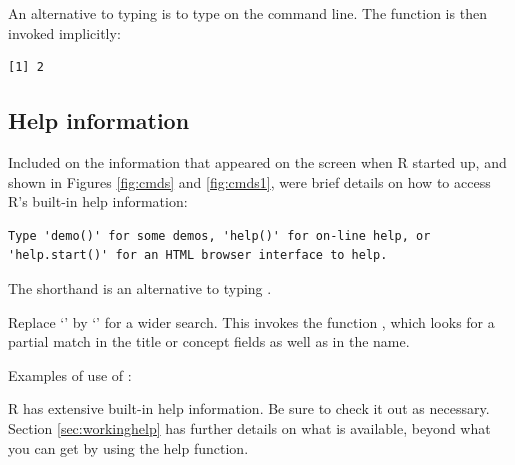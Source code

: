 An alternative to typing  is to
type  on the command line.  The function 
is then invoked implicitly:
\begin{knitrout}
\color{fgcolor}\begin{kframe}
\begin{alltt}
\end{alltt}
\begin{verbatim}
[1] 2
\end{verbatim}
\end{kframe}
\end{knitrout}

\subsection{Help information}\label{ss:ch1-help}

Included on the information that appeared on the screen when R started
up, and shown in Figures \ref{fig:cmds} and \ref{fig:cmds1}, were brief
details on how to access R's built-in help information:
{\small
\begin{verbatim}
Type 'demo()' for some demos, 'help()' for on-line help, or
'help.start()' for an HTML browser interface to help.
\end{verbatim}
}
\noindent
The shorthand  is an alternative to typing
.

Replace `' by `' for a wider search.  This invokes
the function , which looks for a partial match
in the title or concept fields as well as in the name.
\begin{marginfigure}[-15pt]
Examples of use of :\\[-5pt]
\begin{knitrout}
\color{fgcolor}\begin{kframe}
\begin{alltt}
\hlopt{::}
\end{alltt}
\end{kframe}
\end{knitrout}
\end{marginfigure}

R has extensive built-in help information.  Be sure to check it out
as necessary.  Section \ref{sec:workinghelp} has further details on
what is available, beyond what you can get by using the help function.

